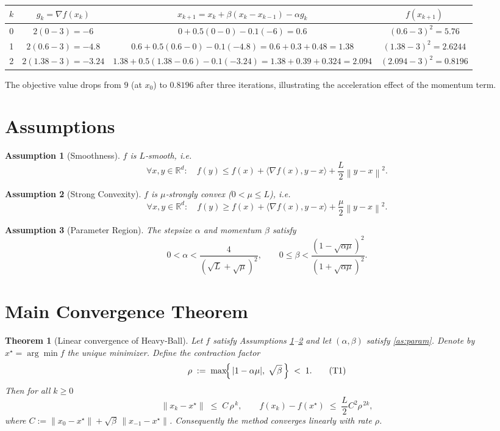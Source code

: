 \documentclass{article}
\newtheorem{theorem}{Theorem}
\newtheorem{assumption}{Assumption}
\newcommand{\norm}[1]{\left\lVert#1\right\rVert}
\newcommand{\R}{\mathbb{R}}
\begin{document}
\begin{center}
\begin{tabular}{c|c|c|c}
$k$ & $g_k= \nabla f(x_k)$ & $x_{k+1}=x_k+\beta(x_k-x_{k-1})-\alpha g_k$ & $f(x_{k+1})$\\ \hline
0 & $2(0-3)=-6$ & $0+0.5(0-0)-0.1(-6)=0.6$ & $(0.6-3)^2=5.76$\\[4pt]
1 & $2(0.6-3)=-4.8$ & $0.6+0.5(0.6-0)-0.1(-4.8)=0.6+0.3+0.48=1.38$ & $(1.38-3)^2=2.6244$\\[4pt]
2 & $2(1.38-3)=-3.24$ & $1.38+0.5(1.38-0.6)-0.1(-3.24)=1.38+0.39+0.324=2.094$ & $(2.094-3)^2=0.8196$
\end{tabular}
\end{center}
The objective value drops from $9$ (at $x_0$) to $0.8196$ after three iterations, illustrating the acceleration effect of the momentum term.

\newpage
\section*{Assumptions}
\begin{assumption}[Smoothness]\label{as:smooth}
$f$ is $L$‑smooth, i.e.
\[
\forall x,y\in\R^{d}:\quad 
f(y)\le f(x)+\langle\nabla f(x),y-x\rangle+\frac{L}{2}\norm{y-x}^{2}.
\tag{A1}
\]
\end{assumption}
\begin{assumption}[Strong Convexity]\label{as:strong}
$f$ is $\mu$‑strongly convex ($0<\mu\le L$), i.e.
\[
\forall x,y\in\R^{d}:\quad 
f(y)\ge f(x)+\langle\nabla f(x),y-x\rangle+\frac{\mu}{2}\norm{y-x}^{2}.
\tag{A2}
\]
\end{assumption}
\begin{assumption}[Parameter Region]\label{as:param}
The stepsize $\alpha$ and momentum $\beta$ satisfy
\[
0<\alpha<\frac{4}{(\sqrt{L}+\sqrt{\mu})^{2}},\qquad
0\le\beta<\frac{(1-\sqrt{\alpha\mu})^{2}}{(1+\sqrt{\alpha\mu})^{2}}.
\tag{A3}
\]
\end{assumption}

\section*{Main Convergence Theorem}
\begin{theorem}[Linear convergence of Heavy‑Ball]\label{thm:linear}
Let $f$ satisfy Assumptions \ref{as:smooth}–\ref{as:strong} and let
$(\alpha,\beta)$ satisfy \eqref{as:param}. Denote by $x^{\star}=\arg\min f$ the unique minimizer.
Define the contraction factor
\[
\rho\;:=\;\max\!\Bigl\{\,|1-\alpha\mu|,\;\sqrt{\beta}\,\Bigr\}\;<\;1 .
\tag{T1}
\]
Then for all $k\ge 0$
\[
\norm{x_{k}-x^{\star}}\;\le\;C\,\rho^{\,k},
\qquad
f(x_{k})-f(x^{\star})\;\le\;\frac{L}{2}C^{2}\rho^{\,2k},
\tag{T2}
\]
where $C:=\norm{x_{0}-x^{\star}}+\sqrt{\beta}\,\norm{x_{-1}-x^{\star}}$.
Consequently the method converges \emph{linearly} with rate $\rho$.
\end{theorem}
\end{document}
